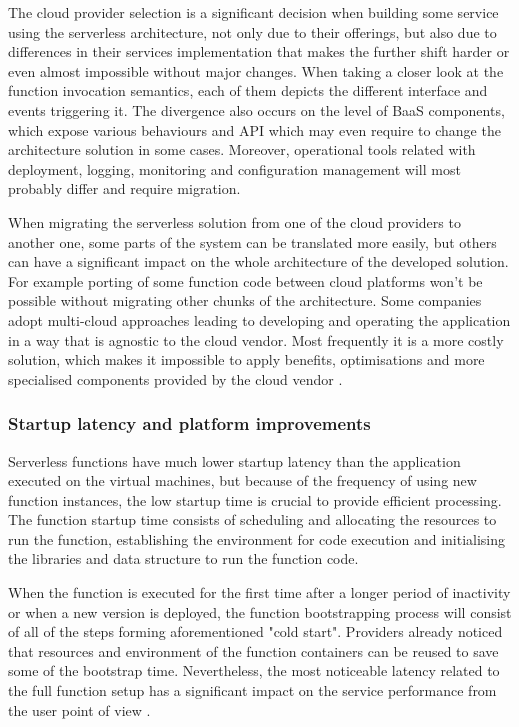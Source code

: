 The cloud provider selection is a significant decision when building some service using the serverless architecture, not only due to their offerings, but also due to differences in their services implementation that makes the further shift harder or even almost impossible without major changes. When taking a closer look at the function invocation semantics, each of them depicts the different interface and events triggering it. The divergence also occurs on the level of BaaS components, which expose various behaviours and API which may even require to change the architecture solution in some cases. Moreover, operational tools related with deployment, logging, monitoring and configuration management will most probably differ and require migration.

When migrating the serverless solution from one of the cloud providers to another one, some parts of the system can be translated more easily, but others can have a significant impact on the whole architecture of the developed solution. For example porting of some function code between cloud platforms won't be possible without migrating other chunks of the architecture. Some companies adopt multi-cloud approaches leading to developing and operating the application in a way that is agnostic to the cloud vendor. Most frequently it is a more costly solution, which makes it impossible to apply benefits, optimisations and more specialised components provided by the cloud vendor \cite{MartinFowlerServerless}.

\subsubsection*{Startup latency and platform improvements}

Serverless functions have much lower startup latency than the application executed on the virtual machines, but because of the frequency of using new function instances, the low startup time is crucial to provide efficient processing. The function startup time consists of scheduling and allocating the resources to run the function, establishing the environment for code execution and initialising the libraries and data structure to run the function code.

When the function is executed for the first time after a longer period of inactivity or when a new version is deployed, the function bootstrapping process will consist of all of the steps forming aforementioned "cold start". Providers already noticed that resources and environment of the function containers can be reused to save some of the bootstrap time. Nevertheless, the most noticeable latency related to the full function setup has a significant impact on the service performance from the user point of view \cite{BerkeleyServerless}.

